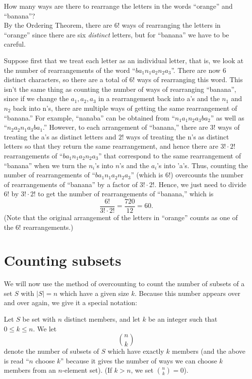 \documentclass[11pt,dvipsnames]{book}
\numberwithin{figure}{section} %
\numberwithin{table}{section} %
\begin{document}
\begin{example}
How many ways are there to rearrange the letters in the words ``orange'' and ``banana''? \\

By the Ordering Theorem, there are $6!$ ways of rearranging the letters in ``orange'' since there are six {\it distinct} letters, but for ``banana'' we have to be careful.

Suppose first that we treat each letter as an individual letter, that is, we look at the number of rearrangements of the word ``$ba_{1}n_{1}a_{2}n_{2}a_{3}$''. There are now 6 distinct characters, so there are a total of $6!$ ways of rearranging this word. This isn't the same thing as counting the number of ways of rearranging ``banana'', since if we change the $a_{1},a_{2},a_{3}$ in a rearrangement back into a's and the $n_{1}$ and $n_{2}$ back into n's, there are multiple ways of getting the same rearrangement of ``banana.'' For example, ``nanaba'' can be obtained from ``$n_{1}a_{1}n_{2}a_{3}ba_{2}$'' as well as ``$n_{2}a_{2}n_{1}a_{3}ba_{1}$.'' However, to each arrangement of ``banana,'' there are $3!$ ways of treating the a's as distinct letters and $2!$ ways of treating the n's as distinct letters so that they return the same rearrangement, and hence there are $3!\cdot 2!$ rearrangements of ``$ba_{1}n_{1}a_{2}n_{2}a_{3}$'' that correspond to the same rearrangement of ``banana'' when we turn the $n_i$'s into $n$'s and the $a_i$'s into 'a's. Thus,  counting the number of rearrangements of ``$ba_{1}n_{1}a_{2}n_{2}a_{3}$''  (which is $6!$) overcounts the number of rearrangements of ``banana'' by a factor of $3!\cdot 2!$. Hence, we just need to divide $6!$ by $3!\cdot 2!$ to get the number of rearrangements of ``banana,'' which is
\[
\frac{6!}{3!\cdot 2!} = \frac{720}{12} = 60.
\]
(Note that the original arrangement of the letters in ``orange'' counts as one of the
$6!$ rearrangements.)
\end{example}

\section{Counting subsets}%
\label{countingsubsets}

We will now use the method of overcounting to count the number of subsets of a set $S$ with $|S|=n$ which have a given size $k$. Because this number appears over and over again, we give it a special notation:\\

\begin{definition}
Let $S$ be set with $n$ distinct members, and let $k$ be an integer such that $0\leq k\leq n$. We let
\[
{n \choose k}
\]
denote the number of subsets of $S$ which have exactly $k$ members (and the above is read ``$n$ choose $k$'' because it gives the number of ways we can choose $k$ members from an $n$-element set). (If $k>n$, we set ${n \choose k}=0$).
\end{definition}
\end{document}
